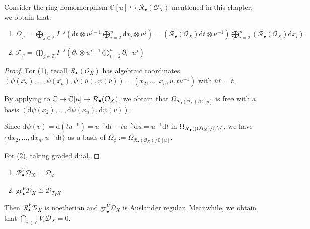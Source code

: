 \begin{lemma}

    Consider the ring homomorphism $\mathbb{C}[u]\hookrightarrow \mathcal{R}_\bullet(\mathcal{O}_X)$ mentioned in this chapter, we obtain that:

    \begin{enumerate}
        \item $\Omega_\varphi = \bigoplus\limits_{j \in \mathbb{Z}} I^{-j} (\mathrm{d}t \otimes u^{j-1}  \bigoplus\limits_{i=2}^{n} \mathrm{d}x_{i} \otimes u^{j}) = \left(\mathcal{R}_{\bullet}(\mathcal{O}_X) \mathrm{d}t \otimes u^{-1}\right)  \bigoplus\limits_{i=2}^{n} \left(\mathcal{R}_{\bullet}(\mathcal{O}_X) \mathrm{d}x_{i}\right).$
        \item $\mathcal{T}_\varphi = \bigoplus\limits_{j \in \mathbb{Z}} I^{-j} (\partial_t \otimes u^{j+1} \bigoplus_{i=2}^n \partial_i \cdot u^j)$
    \end{enumerate}
\end{lemma}
\begin{proof}
    For (1), recall $\mathcal{R}_{\bullet}(\mathcal{O}_X)$ has algebraic coordinates $(\psi(\overline{x_2}), \ldots, \psi(\overline{x_n}), \psi(\overline{u}), \psi(\overline{v})) = (x_2, \ldots, x_n, u, tu^{-1})$ with $\overline{u}\overline{v}= \overline{t}$.

    By applying \cite[\href{https://stacks.math.columbia.edu/tag/00RS}{Tag 00RS}]{stacks-project} to $\mathbb{C} \to \mathbb{C}[u] \to \mathcal{R}_{\bullet}(\mathcal{O}_X)$, we obtain that $\Omega_{\mathcal{R}_{\bullet}(\mathcal{O}_X)/\mathbb{C}[u]}$ is free with a basis $(\mathrm{d}\psi(\overline{x_2}), \ldots, \mathrm{d}\psi(\overline{x_n}), \mathrm{d}\psi(\overline{v}))$.

    Since $\mathrm{d}\psi(\overline{v}) = \mathrm{d}(t u^{-1}) = u^{-1}\mathrm{d}t  - t u^{-2} \mathrm{d}u = u^{-1} \mathrm{d}t $ in $\Omega_{\mathcal{R}_{\bullet}(\mathcal(O)_X)/\mathbb{C}[u]}$, we have $\{\mathrm{d}x_2, \ldots, \mathrm{d}x_n, u^{-1}\mathrm{d}t\}$ as a basis of $\Omega_{\phi}:=\Omega_{\mathcal{R}_{\bullet}(\mathcal{O}_X)/\mathbb{C}[u]}$.

    For (2), taking graded dual.
\end{proof}

\begin{corollary}\label{cor:Rees-ring-of-V-filtration-D-module}
    \quad
    \begin{enumerate}
        \item $\mathcal{R}_{\bullet}^V \mathcal{D}_X = \mathcal{D}_\varphi$
        \item  $\mathrm{gr}_{\bullet}^V \mathcal{D}_X \cong \mathcal{D}_{T_Y X}$
    \end{enumerate}
    Then $\mathcal{R}^V_{\bullet} \mathcal{D}_X$ is noetherian and  $\mathrm{gr}^{V}_{\bullet} \mathcal{D}_X$ is Auslander regular. Meanwhile, we obtain that $\bigcap\limits_{i \in \mathbb{Z}} V_i \mathcal{D}_X = 0$.

\end{corollary}

